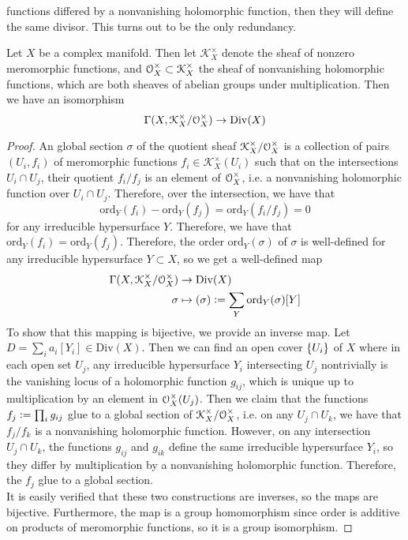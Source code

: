 functions differed by a nonvanishing holomorphic function, then they will define the
same divisor. This turns out to be the only redundancy.
%
\begin{thm}
Let $X$ be a complex manifold. Then let $\mathcal{K}^\times_X$ denote the sheaf of
nonzero meromorphic functions, and $\mathcal{O}_X^\times \subset \mathcal{K}^\times_X$ the sheaf
of nonvanishing holomorphic functions, which are both sheaves of abelian groups
under multiplication. Then we have an isomorphism
\[
\Gamma(X, \mathcal{K}^\times_X/\mathcal{O}^\times_X) \to \mathrm{Div}(X)
\]
\end{thm}
%
\begin{proof}
An global section $\sigma$ of the quotient sheaf $\mathcal{K}_X^\times / \mathcal{O}_X^\times$
is a collection of pairs $(U_i, f_i)$ of meromorphic functions
$f_i \in \mathcal{K}_X^\times(U_i)$ such that on the intersections $U_i \cap U_j$, their
quotient  $f_i/f_j$ is an element of $\mathcal{O}_X^\times$, i.e. a nonvanishing holomorphic
function over $U_i \cap U_j$. Therefore, over the intersection, we have that
\[
\mathrm{ord}_Y(f_i) - \mathrm{ord}_Y(f_j) = \mathrm{ord}_Y(f_i/f_j) = 0
\]
for any irreducible hypersurface $Y$. Therefore, we have that
$\mathrm{ord}_Y(f_i) = \mathrm{ord}_Y(f_j)$. Therefore, the order
$\mathrm{ord}_Y(\sigma)$ of $\sigma$ is well-defined for any irreducible hypersurface
$Y \subset X$, so we get a well-defined map
\begin{align*}
\Gamma(X, \mathcal{K}^\times_X / \mathcal{O}_X^\times) &\to \mathrm{Div}(X) \\
\sigma &\mapsto (\sigma) \vcentcolon= \sum_Y \mathrm{ord}_Y(\sigma)[Y]
\end{align*}
To show that this mapping is bijective, we provide an inverse map. Let
$D = \sum_i a_i [Y_i] \in \mathrm{Div}(X)$. Then we can find an open cover $\left\lbrace U_i \right\rbrace$
of $X$ where in each open set $U_j$, any irreducible hypersurface $Y_i$ intersecting
$U_j$ nontrivially is the vanishing locus of a holomorphic function $g_{ij}$, which
is unique up to multiplication by an element in $\mathcal{O}_X^\times(U_j)$. Then we claim that
the functions $f_j \vcentcolon= \prod_i g_{ij}$ glue to a global section of
$\mathcal{K}_X^\times / \mathcal{O}_X^\times$, i.e. on any $U_j \cap U_k$, we have that
$f_j/f_k$ is a nonvanishing holomorphic function. However, on any intersection
$U_j \cap U_k$, the functions $g_{ij}$ and $g_{ik}$ define the same irreducible
hypersurface $Y_i$, so they differ by multiplication by a nonvanishing holomorphic
function. Therefore, the $f_j$ glue to a global section. \\

It is easily verified that these two constructions are inverses, so the maps
are bijective. Furthermore, the map is a group homomorphism since order is
additive on products of meromorphic functions, so it is a group isomorphism.
\end{proof}
